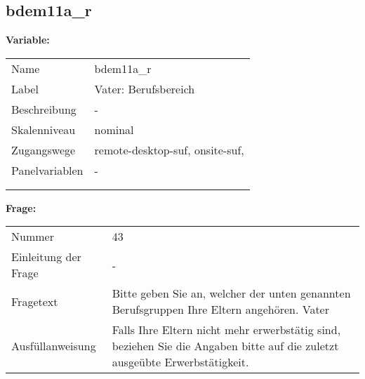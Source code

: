 	
	
	\subsection{bdem11a\_r}
	\label{subSection:bdem11a_r}

	\noindent\textbf{Variable:}\\
		\begin{tabular}{lL{11.3cm}}
			\label{tableVariable:bdem11a_r}
			Name & bdem11a\_r \\
			Label & Vater: Berufsbereich \\
			Beschreibung & - \\
			Skalenniveau & nominal \\
			Zugangswege &
				remote-desktop-suf,
				onsite-suf,
 \\
			Panelvariablen & -
			 \\
			 \\
 \\
		\end{tabular}

		\vspace*{1 cm}
		\noindent\textbf{Frage:}\\
		\begin{tabular}{lL{11.3cm}}
			\label{tableQuestion:bdem11a_r}
			Nummer & 43 \\
			Einleitung der Frage & - \\
			Fragetext & Bitte geben Sie an, welcher der unten genannten Berufsgruppen Ihre Eltern angehören.
Vater \\
			Ausfüllanweisung & Falls Ihre Eltern nicht mehr erwerbstätig sind, beziehen Sie die Angaben bitte auf die zuletzt ausgeübte Erwerbstätigkeit. \\
		\end{tabular}





